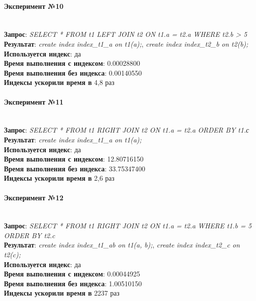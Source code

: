 \paragraph{Эксперимент №10}\\
\textbf{Запрос}: \textit{SELECT * FROM t1 LEFT JOIN t2 ON t1.a = t2.a WHERE t2.b > 5}\\
\textbf{Результат}: \textit{create index index_t1_a on t1(a);}, \textit{create index index_t2_b on t2(b);}\\
\textbf{Используется индекс}: да\\
\textbf{Время выполнения с индексом}: 0.00028800\\
\textbf{Время выполнения без индекса}: 0.00140550\\
\textbf{Индексы ускорили время в} 4,8 раз\\

\paragraph{Эксперимент №11}\\
\textbf{Запрос}: \textit{SELECT * FROM t1 RIGHT JOIN t2 ON t1.a = t2.a ORDER BY t1.с}\\
\textbf{Результат}: \textit{create index index_t1_a on t1(a);}\\
\textbf{Используется индекс}: да\\
\textbf{Время выполнения с индексом}: 12.80716150\\
\textbf{Время выполнения без индекса}: 33.75347400\\
\textbf{Индексы ускорили время в} 2,6 раз\\

\paragraph{Эксперимент №12}\\
\textbf{Запрос}: \textit{SELECT * FROM t1 RIGHT JOIN t2 ON t1.a = t2.a WHERE t1.b = 5 ORDER BY t2.c}\\
\textbf{Результат}: \textit{create index index_t1_ab on t1(a, b);}, \textit{create index index_t2_c on t2(c);}\\
\textbf{Используется индекс}: да\\
\textbf{Время выполнения с индексом}: 0.00044925\\
\textbf{Время выполнения без индекса}: 1.00510150\\
\textbf{Индексы ускорили время в} 2237 раз\\

